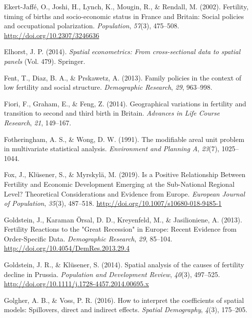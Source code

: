 \documentclass[12pt,twoside]{reedthesis}
\begin{document}
\leavevmode\hypertarget{ref-ekert-jaffe2002}{}%
Ekert-Jaffé, O., Joshi, H., Lynch, K., Mougin, R., \& Rendall, M. (2002). Fertility, timing of births and socio-economic status in France and Britain: Social policies and occupational polarization. \emph{Population}, \emph{57}(3), 475--508. \url{http://doi.org/10.2307/3246636}

\leavevmode\hypertarget{ref-elhorst2014}{}%
Elhorst, J. P. (2014). \emph{Spatial econometrics: From cross-sectional data to spatial panels} (Vol. 479). Springer.

\leavevmode\hypertarget{ref-fent2013}{}%
Fent, T., Diaz, B. A., \& Prskawetz, A. (2013). Family policies in the context of low fertility and social structure. \emph{Demographic Research}, \emph{29}, 963--998.

\leavevmode\hypertarget{ref-fiori2014}{}%
Fiori, F., Graham, E., \& Feng, Z. (2014). Geographical variations in fertility and transition to second and third birth in Britain. \emph{Advances in Life Course Research}, \emph{21}, 149--167.

\leavevmode\hypertarget{ref-fotheringham1991}{}%
Fotheringham, A. S., \& Wong, D. W. (1991). The modifiable areal unit problem in multivariate statistical analysis. \emph{Environment and Planning A}, \emph{23}(7), 1025--1044.

\leavevmode\hypertarget{ref-fox2019}{}%
Fox, J., Klüsener, S., \& Myrskylä, M. (2019). Is a Positive Relationship Between Fertility and Economic Development Emerging at the Sub-National Regional Level? Theoretical Considerations and Evidence from Europe. \emph{European Journal of Population}, \emph{35}(3), 487--518. \url{http://doi.org/10.1007/s10680-018-9485-1}

\leavevmode\hypertarget{ref-goldstein2013}{}%
Goldstein, J., Karaman Örsal, D. D., Kreyenfeld, M., \& Jasilioniene, A. (2013). Fertility Reactions to the "Great Recession" in Europe: Recent Evidence from Order-Specific Data. \emph{Demographic Research}, \emph{29}, 85--104. \url{http://doi.org/10.4054/DemRes.2013.29.4}

\leavevmode\hypertarget{ref-goldstein2014}{}%
Goldstein, J. R., \& Klüsener, S. (2014). Spatial analysis of the causes of fertility decline in Prussia. \emph{Population and Development Review}, \emph{40}(3), 497--525. \url{http://doi.org/10.1111/j.1728-4457.2014.00695.x}

\leavevmode\hypertarget{ref-golgher2016}{}%
Golgher, A. B., \& Voss, P. R. (2016). How to interpret the coefficients of spatial models: Spillovers, direct and indirect effects. \emph{Spatial Demography}, \emph{4}(3), 175--205.
\end{document}
